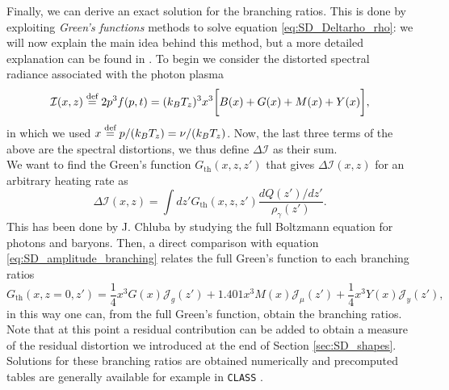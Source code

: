 Finally, we can derive an exact solution for the branching ratios. This is done by exploiting \emph{Green's functions} methods to solve equation \eqref{eq:SD_Deltarho_rho}: we will now explain the main idea behind this method, but a more detailed explanation can be found in \cite{Lucca_2020}. To begin we consider the distorted spectral radiance associated with the photon plasma
$$\mathcal{I}(x,z)\stackrel{\text{def}}{=} 2p^3f(p,t)=(k_BT_z)^3x^3\bigg[B(x)+G(x)+M(x)+Y(x)\bigg],$$
in which we used $x\stackrel{\text{def}}{=} p/(k_BT_z)=\nu/(k_BT_z)$.
Now, the last three terms of the above are the spectral distortions, we thus define $\Delta \mathcal{I}$ as their sum.\\
We want to find the Green's function $G_{\text{th}}(x,z,z')$ that gives $\Delta \mathcal{I}(x,z)$ for an arbitrary heating rate as
$$\Delta \mathcal{I}(x,z)=\int dz'G_{\text{th}}(x,z,z')\frac{dQ(z')/dz'}{\rho_\gamma(z')}.$$
This has been done by J. Chluba \cite{Chluba_Green} by studying the full Boltzmann equation for photons and baryons. Then, a direct comparison with equation \eqref{eq:SD_amplitude_branching} relates the full Green's function to each branching ratios
$$G_{\text{th}}(x,z=0,z')=\frac{1}{4}x^3G(x)\mathcal{J}_g(z')+1.401x^3M(x)\mathcal{J}_\mu(z')+\frac{1}{4}x^3Y(x)\mathcal{J}_y(z'),$$ in this way one can, from the full Green's function, obtain the branching ratios. Note that at this point a residual contribution can be added to obtain a measure of the residual distortion we introduced at the end of Section \ref{sec:SD_shapes}. Solutions for these branching ratios are obtained numerically and precomputed tables are generally available for example in \texttt{CLASS} \cite{CLASS}.